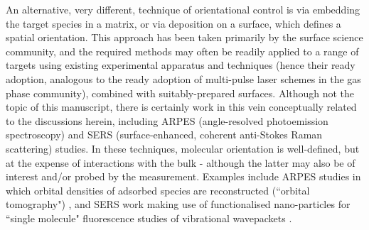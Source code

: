 \documentclass[10pt]{article}
\begin{document}
An alternative, very different, technique of orientational control is via embedding the target species in a matrix, or via deposition on a surface, which defines a spatial orientation. This approach has been taken primarily by the surface science community, and the required methods may often be readily applied to a range of targets using existing experimental apparatus and techniques (hence their ready adoption, analogous to the ready adoption of multi-pulse laser schemes in the gas phase community), combined with suitably-prepared surfaces. Although not the topic of this manuscript, there is certainly work in this vein conceptually related to the discussions herein, including ARPES (angle-resolved photoemission spectroscopy) and SERS (surface-enhanced, coherent anti-Stokes Raman scattering) studies. In these techniques, molecular orientation is well-defined, but at the expense of interactions with the bulk - although the latter may also be of interest and/or probed by the measurement. 
Examples include ARPES studies in which orbital densities of adsorbed species are reconstructed (``orbital tomography") \cite{Puschnig2009a,dauth2014AngleResolvedPhotoemission}, and SERS work making use of functionalised nano-particles for ``single molecule" fluorescence studies of vibrational wavepackets \cite{Yampolsky2014}. 




\end{document}
